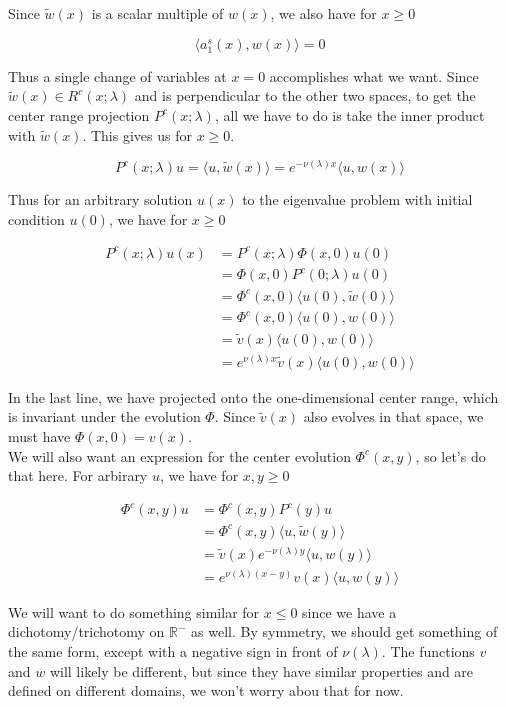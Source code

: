 \documentclass[12pt]{article}
\def\R{{\mathbb R}}
\begin{document}
Since $\tilde{w}(x)$ is a scalar multiple of $w(x)$, we also have for $x \geq 0$

\[
\langle a^s_1(x), w(x) \rangle = 0
\]

Thus a single change of variables at $x = 0$ accomplishes what we want. Since $\tilde{w}(x) \in R^c(x; \lambda)$ and is perpendicular to the other two spaces, to get the center range projection $P^c(x; \lambda)$, all we have to do is take the inner product with $\tilde{w}(x)$. This gives us for $x \geq 0$.

\[
P^c(x; \lambda)u = \langle u, \tilde{w}(x) \rangle = e^{-\nu(\lambda)x}\langle u, w(x) \rangle
\]

Thus for an arbitrary solution $u(x)$ to the eigenvalue problem with initial condition $u(0)$, we have for $x \geq 0$

\begin{align*}
P^c(x; \lambda)u(x) &= P^c(x; \lambda)\Phi(x,0)u(0) \\
&= \Phi(x,0)P^c(0; \lambda)u(0) \\
&= \Phi^c(x,0) \langle u(0), \tilde{w}(0) \rangle  \\
&= \Phi^c(x,0) \langle u(0), w(0) \rangle \\
&= \tilde{v}(x) \langle u(0), w(0) \rangle \\
&= e^{\nu(\lambda)x} \tilde{v}(x) \langle u(0), w(0) \rangle
\end{align*}

In the last line, we have projected onto the one-dimensional center range, which is invariant under the evolution $\Phi$. Since $\tilde{v}(x)$ also evolves in that space, we must have $\Phi(x,0) = v(x)$.\\

We will also want an expression for the center evolution $\Phi^c(x,y)$, so let's do that here. For arbirary $u$, we have for $x, y \geq 0$

\begin{align*}
\Phi^c(x,y)u &= \Phi^c(x,y) P^c(y) u \\
&= \Phi^c(x,y) \langle u, \tilde{w}(y) \rangle \\
&= \tilde{v}(x) e^{-\nu(\lambda)y} \langle u, w(y) \rangle \\
&=e^{\nu(\lambda)(x-y)} v(x) \langle u, w(y) \rangle 
\end{align*}

We will want to do something similar for $x \leq 0$ since we have a dichotomy/trichotomy on $\R^-$ as well. By symmetry, we should get something of the same form, except with a negative sign in front of $\nu(\lambda)$. The functions $v$ and $w$ will likely be different, but since they have similar properties and are defined on different domains, we won't worry abou that for now.\\
\end{document}

